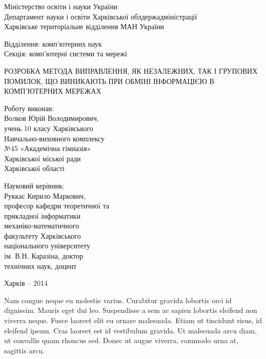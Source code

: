 \documentclass[a4paper, 14pt]{article}
\begin{document}
\begin{titlepage}
\begin{center}
Міністерство освіти і науки України\\
Департамент науки і освіти Харківської облдержадміністрації\\
Харківське територіальне відділення МАН України\\
\end{center}
\par\null\par
\begin{changemargin}{10cm}{0cm}
Відділення: комп'ютерних наук\\
Секція: комп'ютерні системи та мережі
\end{changemargin}
\par\null\par
\begin{center}
РОЗРОБКА МЕТОДА ВИПРАВЛЕННЯ, ЯК НЕЗАЛЕЖНИХ, ТАК І ГРУПОВИХ
ПОМИЛОК, ЩО ВИНИКАЮТЬ ПРИ ОБМІНІ ІНФОРМАЦІЄЮ В
КОМП'ЮТЕРНИХ МЕРЕЖАХ
\end{center}
\par\null\par\null\par\null
\begin{changemargin}{10cm}{0cm}
Роботу виконав:\\
Волков Юрій Володимирович,\\
учень 10 класу Харківського\\
Навчально-виховного комплексу\\
№45 «Академічна гімназія»\\
Харківської міської ради\\
Харківської області
\end{changemargin}
\par
\begin{changemargin}{10cm}{0cm}
Науковий керівник:\\
Руккас Кирило Маркович,\\
професор кафедри теоретичної та\\
прикладної інформатики\\
механіко-математичного\\
факультету Харківського\\
національного університету\\
ім. В.Н. Каразіна, доктор\\
технічних наук, доцент\\
\vspace*{\fill}
\end{changemargin}
\begin{center}
Харків -- 2014 
\end{center}
\end{titlepage}
\setcounter{page}{2}
Nam congue neque eu molestie varius. Curabitur gravida lobortis orci id dignissim. Mauris eget dui leo. Suspendisse a sem ac sapien lobortis eleifend non viverra neque. Fusce laoreet elit eu ornare malesuada. Etiam ut tincidunt risus, id eleifend ipsum. Cras laoreet est id vestibulum gravida. Ut malesuada arcu diam, ut convallis quam rhoncus sed. Donec ut augue viverra, commodo urna at, sagittis arcu.
\end{document}
